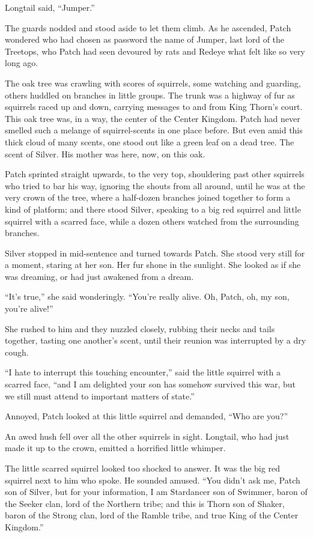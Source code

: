 \documentclass[ebook,oneside,openany,12pt]{memoir}
\begin{document}
Longtail said, “Jumper.”

The guards nodded and stood aside to let them climb. As he ascended,
Patch wondered who had chosen as password the name of Jumper, last
lord of the Treetops, who Patch had seen devoured by rats and Redeye
what felt like so very long ago.

The oak tree was crawling with scores of squirrels, some watching and
guarding, others huddled on branches in little groups. The trunk was a
highway of fur as squirrels raced up and down, carrying messages to
and from King Thorn’s court. This oak tree was, in a way, the center
of the Center Kingdom. Patch had never smelled such a melange of
squirrel-scents in one place before. But even amid this thick cloud of
many scents, one stood out like a green leaf on a dead tree. The scent
of Silver. His mother was here, now, on this oak.

Patch sprinted straight upwards, to the very top, shouldering past
other squirrels who tried to bar his way, ignoring the shouts from all
around, until he was at the very crown of the tree, where a half-dozen
branches joined together to form a kind of platform; and there stood
Silver, speaking to a big red squirrel and little squirrel with a
scarred face, while a dozen others watched from the surrounding
branches.

Silver stopped in mid-sentence and turned towards Patch. She stood
very still for a moment, staring at her son. Her fur shone in the
sunlight. She looked as if she was dreaming, or had just awakened from
a dream.

“It’s true,” she said wonderingly. “You’re really alive. Oh, Patch,
oh, my son, you’re alive!”

She rushed to him and they nuzzled closely, rubbing their necks and
tails together, tasting one another’s scent, until their reunion was
interrupted by a dry cough.

“I hate to interrupt this touching encounter,” said the little
squirrel with a scarred face, “and I am delighted your son has somehow
survived this war, but we still must attend to important matters of
state.”

Annoyed, Patch looked at this little squirrel and demanded, “Who are
you?”

An awed hush fell over all the other squirrels in sight. Longtail, who
had just made it up to the crown, emitted a horrified little whimper.

The little scarred squirrel looked too shocked to answer. It was the
big red squirrel next to him who spoke. He sounded amused. “You didn’t
ask me, Patch son of Silver, but for your information, I am Stardancer
son of Swimmer, baron of the Seeker clan, lord of the Northern tribe;
and this is Thorn son of Shaker, baron of the Strong clan, lord of the
Ramble tribe, and true King of the Center Kingdom.”
\end{document}
